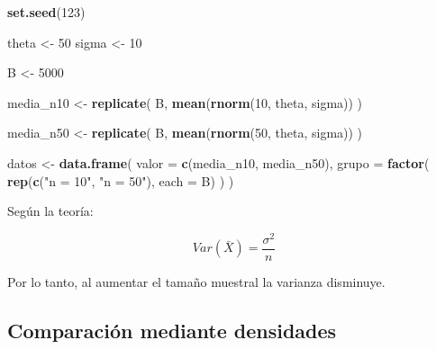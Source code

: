 \documentclass[
  11pt,
]{report}
\newenvironment{Shaded}{\begin{snugshade}}{\end{snugshade}}
\newcommand{\AttributeTok}[1]{\textcolor[rgb]{0.13,0.29,0.53}{#1}}
\newcommand{\DecValTok}[1]{\textcolor[rgb]{0.00,0.00,0.81}{#1}}
\newcommand{\FunctionTok}[1]{\textcolor[rgb]{0.13,0.29,0.53}{\textbf{#1}}}
\newcommand{\NormalTok}[1]{#1}
\newcommand{\OtherTok}[1]{\textcolor[rgb]{0.56,0.35,0.01}{#1}}
\newcommand{\StringTok}[1]{\textcolor[rgb]{0.31,0.60,0.02}{#1}}
\begin{document}
\begin{Shaded}
\begin{Highlighting}[]
\FunctionTok{set.seed}\NormalTok{(}\DecValTok{123}\NormalTok{)}

\NormalTok{theta }\OtherTok{\textless{}{-}} \DecValTok{50}
\NormalTok{sigma }\OtherTok{\textless{}{-}} \DecValTok{10}

\NormalTok{B }\OtherTok{\textless{}{-}} \DecValTok{5000}

\NormalTok{media\_n10 }\OtherTok{\textless{}{-}} \FunctionTok{replicate}\NormalTok{(}
\NormalTok{  B,}
  \FunctionTok{mean}\NormalTok{(}\FunctionTok{rnorm}\NormalTok{(}\DecValTok{10}\NormalTok{, theta, sigma))}
\NormalTok{)}

\NormalTok{media\_n50 }\OtherTok{\textless{}{-}} \FunctionTok{replicate}\NormalTok{(}
\NormalTok{  B,}
  \FunctionTok{mean}\NormalTok{(}\FunctionTok{rnorm}\NormalTok{(}\DecValTok{50}\NormalTok{, theta, sigma))}
\NormalTok{)}

\NormalTok{datos }\OtherTok{\textless{}{-}} \FunctionTok{data.frame}\NormalTok{(}
  \AttributeTok{valor =} \FunctionTok{c}\NormalTok{(media\_n10, media\_n50),}
  \AttributeTok{grupo =} \FunctionTok{factor}\NormalTok{(}
    \FunctionTok{rep}\NormalTok{(}\FunctionTok{c}\NormalTok{(}\StringTok{"n = 10"}\NormalTok{, }\StringTok{"n = 50"}\NormalTok{),}
        \AttributeTok{each =}\NormalTok{ B)}
\NormalTok{  )}
\NormalTok{)}
\end{Highlighting}
\end{Shaded}

Según la teoría:

\[Var(\bar X)
=
\frac{\sigma^2}{n}\]

Por lo tanto, al aumentar el tamaño muestral la varianza disminuye.

\subsection{Comparación mediante
densidades}\label{comparaciuxf3n-mediante-densidades}
\end{document}
